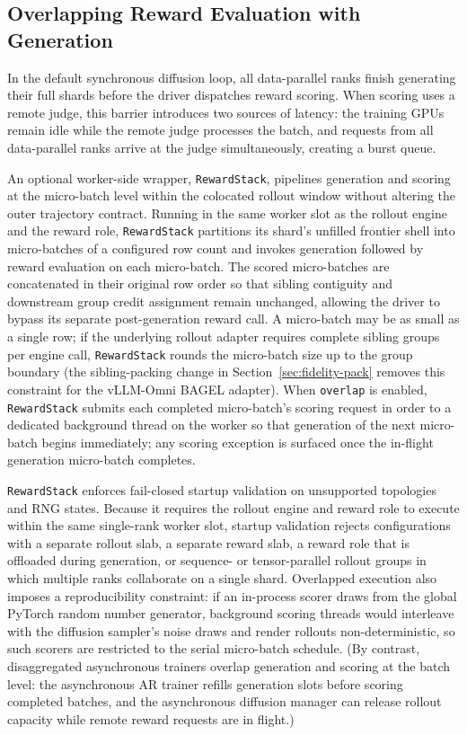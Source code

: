 \subsection{Overlapping Reward Evaluation with Generation}
\label{sec:reward-overlap}

In the default synchronous diffusion loop, all data-parallel ranks finish generating their full shards before the driver dispatches reward scoring.
When scoring uses a remote judge, this barrier introduces two sources of latency: the training GPUs remain idle while the remote judge processes the batch, and requests from all data-parallel ranks arrive at the judge simultaneously, creating a burst queue.

An optional worker-side wrapper, \texttt{RewardStack}, pipelines generation and scoring at the micro-batch level within the colocated rollout window without altering the outer trajectory contract.
Running in the same worker slot as the rollout engine and the reward role, \texttt{RewardStack} partitions its shard's unfilled frontier shell into micro-batches of a configured row count and invokes generation followed by reward evaluation on each micro-batch.
The scored micro-batches are concatenated in their original row order so that sibling contiguity and downstream group credit assignment remain unchanged, allowing the driver to bypass its separate post-generation reward call.
A micro-batch may be as small as a single row; if the underlying rollout adapter requires complete sibling groups per engine call, \texttt{RewardStack} rounds the micro-batch size up to the group boundary (the sibling-packing change in Section~\ref{sec:fidelity-pack} removes this constraint for the vLLM-Omni BAGEL adapter).
When \texttt{overlap} is enabled, \texttt{RewardStack} submits each completed micro-batch's scoring request in order to a dedicated background thread on the worker so that generation of the next micro-batch begins immediately; any scoring exception is surfaced once the in-flight generation micro-batch completes.

\texttt{RewardStack} enforces fail-closed startup validation on unsupported topologies and RNG states.
Because it requires the rollout engine and reward role to execute within the same single-rank worker slot, startup validation rejects configurations with a separate rollout slab, a separate reward slab, a reward role that is offloaded during generation, or sequence- or tensor-parallel rollout groups in which multiple ranks collaborate on a single shard.
Overlapped execution also imposes a reproducibility constraint: if an in-process scorer draws from the global PyTorch random number generator, background scoring threads would interleave with the diffusion sampler's noise draws and render rollouts non-deterministic, so such scorers are restricted to the serial micro-batch schedule.
(By contrast, disaggregated asynchronous trainers overlap generation and scoring at the batch level: the asynchronous AR trainer refills generation slots before scoring completed batches, and the asynchronous diffusion manager can release rollout capacity while remote reward requests are in flight.)

